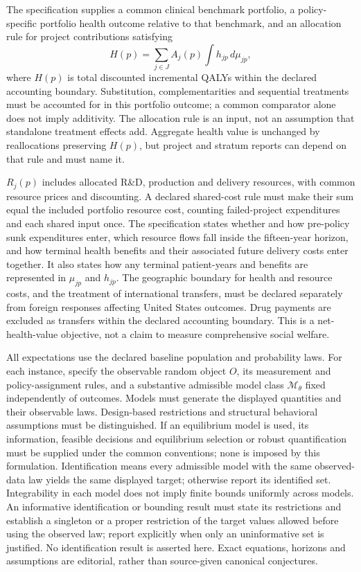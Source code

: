 \documentclass[11pt,a4paper]{article}
\begin{document}
The specification supplies a common clinical benchmark portfolio, a policy-specific portfolio health outcome relative to that benchmark, and an allocation rule for project contributions satisfying
\[
 H(p)=\sum_{j\in J}A_j(p)\int h_{jp}\,d\mu_{jp},
\]
where \(H(p)\) is total discounted incremental QALYs within the declared accounting boundary. Substitution, complementarities and sequential treatments must be accounted for in this portfolio outcome; a common comparator alone does not imply additivity. The allocation rule is an input, not an assumption that standalone treatment effects add. Aggregate health value is unchanged by reallocations preserving \(H(p)\), but project and stratum reports can depend on that rule and must name it.

\(R_j(p)\) includes allocated R\&D, production and delivery resources, with common resource prices and discounting. A declared shared-cost rule must make their sum equal the included portfolio resource cost, counting failed-project expenditures and each shared input once. The specification states whether and how pre-policy sunk expenditures enter, which resource flows fall inside the fifteen-year horizon, and how terminal health benefits and their associated future delivery costs enter together. It also states how any terminal patient-years and benefits are represented in \(\mu_{jp}\) and \(h_{jp}\). The geographic boundary for health and resource costs, and the treatment of international transfers, must be declared separately from foreign responses affecting United States outcomes. Drug payments are excluded as transfers within the declared accounting boundary. This is a net-health-value objective, not a claim to measure comprehensive social welfare.

All expectations use the declared baseline population and probability laws. For each instance, specify the observable random object \(O\), its measurement and policy-assignment rules, and a substantive admissible model class \(\mathcal M_\theta\) fixed independently of outcomes. Models must generate the displayed quantities and their observable laws. Design-based restrictions and structural behavioral assumptions must be distinguished. If an equilibrium model is used, its information, feasible decisions and equilibrium selection or robust quantification must be supplied under the common conventions; none is imposed by this formulation. Identification means every admissible model with the same observed-data law yields the same displayed target; otherwise report its identified set. Integrability in each model does not imply finite bounds uniformly across models. An informative identification or bounding result must state its restrictions and establish a singleton or a proper restriction of the target values allowed before using the observed law; report explicitly when only an uninformative set is justified. No identification result is asserted here. Exact equations, horizons and assumptions are editorial, rather than source-given canonical conjectures.
\end{document}
